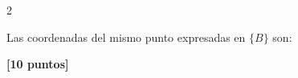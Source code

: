 \documentclass[10pt]{article}
\begin{document}
\begin{multicols}{2}
\begin{question}
            Las coordenadas del mismo punto expresadas en \(\{B\}\) son:

            \begin{inlineanswers}



            \end{inlineanswers}
        \end{question}




        \begin{question}
            \textbf{[10 puntos]}


\end{question}
\end{multicols}
\end{document}
